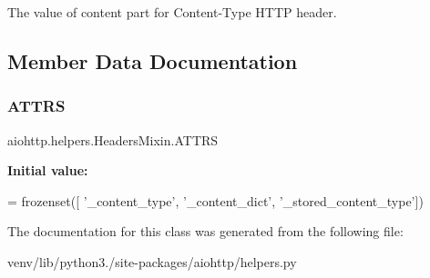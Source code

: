 \begin{DoxyVerb}The value of content part for Content-Type HTTP header.\end{DoxyVerb}
 

\subsection{Member Data Documentation}
\mbox{\label{classaiohttp_1_1helpers_1_1_headers_mixin_a7af8e2edacc4c54eacf8c0a659d775b8}} 
\subsubsection{\texorpdfstring{A\+T\+T\+RS}{ATTRS}}
{\footnotesize\ttfamily aiohttp.\+helpers.\+Headers\+Mixin.\+A\+T\+T\+RS\hspace{0.3cm}{\ttfamily [static]}}

{\bfseries Initial value\+:}
\begin{DoxyCode}
=  frozenset([
        \textcolor{stringliteral}{'\_content\_type'}, \textcolor{stringliteral}{'\_content\_dict'}, \textcolor{stringliteral}{'\_stored\_content\_type'}])
\end{DoxyCode}


The documentation for this class was generated from the following file\+:\begin{DoxyCompactItemize}
\item 
venv/lib/python3./site-\/packages/aiohttp/helpers.\+py\end{DoxyCompactItemize}
